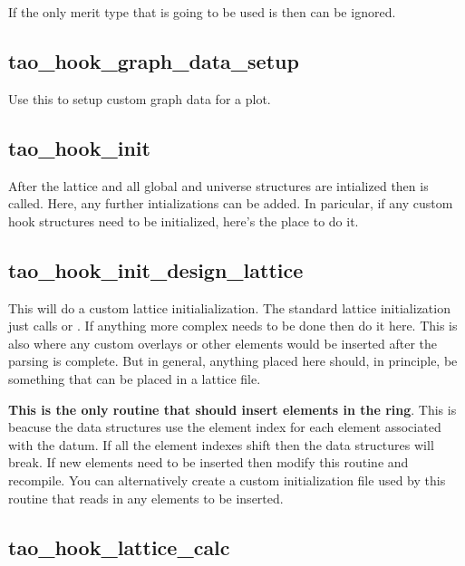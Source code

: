 {If the only merit type that is going to be used is  then
 can be ignored.

\subsection{tao\_hook\_graph\_data\_setup}

Use this to setup custom graph data for a plot.

\subsection{tao\_hook\_init}

After the lattice and all global and universe structures are
intialized then  is called. Here, any further
intializations can be added. In paricular, if any custom hook
structures need to be initialized, here's the place to do it.

\subsection{tao\_hook\_init\_design\_lattice}

This will do a custom lattice initialialization. The standard lattice
initialization just calls  or . If
anything more complex needs to be done then do it here. This is also
where any custom overlays or other elements would be inserted after
the parsing is complete. But in general, anything placed here should,
in principle, be something that can be placed in a lattice file.

\textbf{This is the only routine that should insert elements in the
ring}. This is beacuse the \tao data structures use the element index
for each element associated with the datum. If all the element indexes
shift then the data structures will break. If new elements need to be
inserted then modify this routine and recompile. You can alternatively
create a custom initialization file used by this routine that reads in
any elements to be inserted.

\subsection{tao\_hook\_lattice\_calc}

}
